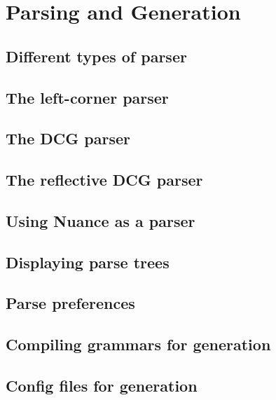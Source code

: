 \chapter{Parsing and Generation}
\label{Chapter:ParsingAndGeneration}

\author{Manny Rayner}

\section{Different types of parser}
\label{Section:TypesOfParser}

\section{The left-corner parser}
\label{Section:LCParser}

\section{The DCG parser}
\label{Section:DCGParser}

\section{The reflective DCG parser}
\label{Section:ReflectiveDCGParser}

\section{Using Nuance as a parser}
\label{Section:NuanceParser}

\section{Displaying parse trees}
\label{Section:ParseTrees}

\section{Parse preferences}
\label{Section:ParsePreferences}

\section{Compiling grammars for generation}
\label{Section:Generation}

\section{Config files for generation}
\label{Section:GenerationConfig}

